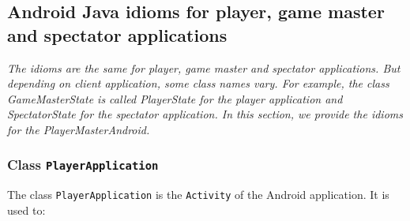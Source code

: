 

\subsection{Android Java idioms for player, game master and spectator
applications}
\label{SS_api_android}

\textit{The idioms are the same for player, game master and spectator applications. But depending on client application, some class names vary. For example, 
the class GameMasterState is called 
PlayerState for the player application and SpectatorState for the 
spectator application. In this section, we provide the idioms for the 
PlayerMasterAndroid.}

\subsubsection{Class \texttt{PlayerApplication}}

The class \texttt{PlayerApplication} is the \texttt{Activity} of the Android 
application. It is used to:

